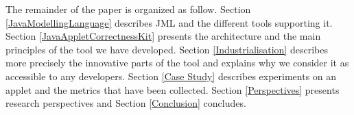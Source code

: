  The remainder of the paper is organized as follow.  Section
 \ref{JavaModellingLanguage} describes JML and the different tools
 supporting it. Section \ref{JavaAppletCorrectnessKit} presents the
 architecture and the main principles of the tool we have
 developed. Section \ref{Industrialisation} describes more precisely
 the innovative parts of the tool and explains why we consider it as
 accessible to any developers. Section \ref{Case Study} describes
 experiments on an applet and the metrics that have been
 collected.  Section \ref{Perspectives} presents research perspectives
 and Section \ref{Conclusion} concludes.
